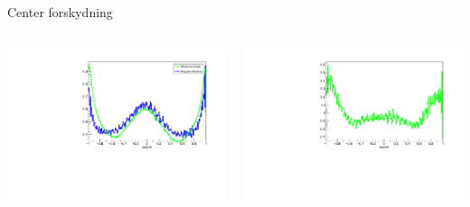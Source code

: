 \begin{frame}{Center forskydning}
\begin{columns}
\begin{overprint}
		\includegraphics[width=\columnwidth]{../figures/betaAngles/centerCorrectedAndData.pdf}
	\end{overprint}
	
	\includegraphics[width=\columnwidth]{../figures/betaAngles/dataDivEffCenterCorrected.pdf}
\end{columns}
\end{frame}

